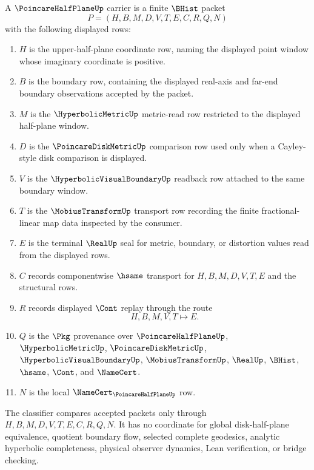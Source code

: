 \begin{definition}
\label{def:poincare-half-plane-carrier}
A $\PoincareHalfPlaneUp$ carrier is a finite $\BHist$ packet
$$
P=(H,B,M,D,V,T,E,C,R,Q,N)
$$
with the following displayed rows:
\begin{enumerate}
\item $H$ is the upper-half-plane coordinate row, naming the displayed point window whose imaginary coordinate is positive.
\item $B$ is the boundary row, containing the displayed real-axis and far-end boundary observations accepted by the packet.
\item $M$ is the $\HyperbolicMetricUp$ metric-read row restricted to the displayed half-plane window.
\item $D$ is the $\PoincareDiskMetricUp$ comparison row used only when a Cayley-style disk comparison is displayed.
\item $V$ is the $\HyperbolicVisualBoundaryUp$ readback row attached to the same boundary window.
\item $T$ is the $\MobiusTransformUp$ transport row recording the finite fractional-linear map data inspected by the consumer.
\item $E$ is the terminal $\RealUp$ seal for metric, boundary, or distortion values read from the displayed rows.
\item $C$ records componentwise $\hsame$ transport for $H,B,M,D,V,T,E$ and the structural rows.
\item $R$ records displayed $\Cont$ replay through the route
$$
H,B,M,V,T \longmapsto E .
$$
\item $Q$ is the $\Pkg$ provenance over $\PoincareHalfPlaneUp$, $\HyperbolicMetricUp$, $\PoincareDiskMetricUp$, $\HyperbolicVisualBoundaryUp$, $\MobiusTransformUp$, $\RealUp$, $\BHist$, $\hsame$, $\Cont$, and $\NameCert$.
\item $N$ is the local $\NameCert_{\PoincareHalfPlaneUp}$ row.
\end{enumerate}
The classifier compares accepted packets only through $H,B,M,D,V,T,E,C,R,Q,N$. It has no coordinate for global disk-half-plane equivalence, quotient boundary flow, selected complete geodesics, analytic hyperbolic completeness, physical observer dynamics, Lean verification, or bridge checking.
\end{definition}

